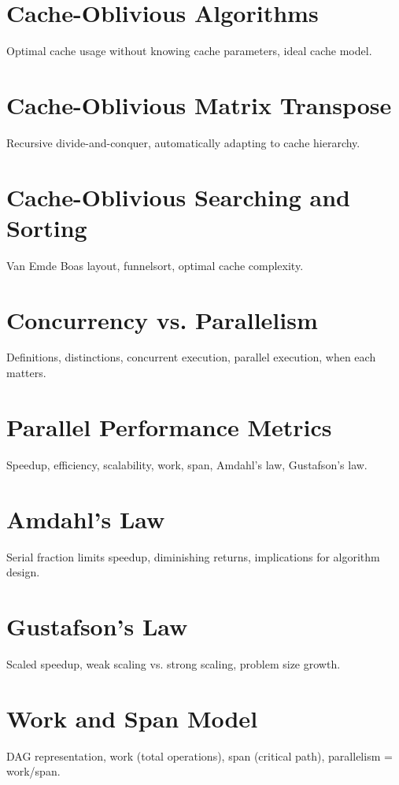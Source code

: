 \chapter{Cache-Oblivious Algorithms}
Optimal cache usage without knowing cache parameters, ideal cache model.

\chapter{Cache-Oblivious Matrix Transpose}
Recursive divide-and-conquer, automatically adapting to cache hierarchy.

\chapter{Cache-Oblivious Searching and Sorting}
Van Emde Boas layout, funnelsort, optimal cache complexity.


\chapter{Concurrency vs. Parallelism}
Definitions, distinctions, concurrent execution, parallel execution, when each matters.

\chapter{Parallel Performance Metrics}
Speedup, efficiency, scalability, work, span, Amdahl's law, Gustafson's law.

\chapter{Amdahl's Law}
Serial fraction limits speedup, diminishing returns, implications for algorithm design.

\chapter{Gustafson's Law}
Scaled speedup, weak scaling vs. strong scaling, problem size growth.

\chapter{Work and Span Model}
DAG representation, work (total operations), span (critical path), parallelism = work/span.


